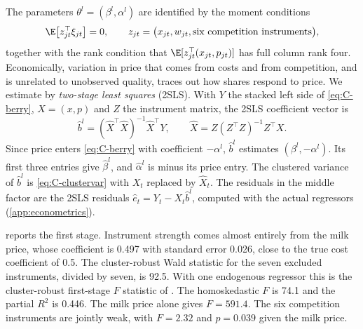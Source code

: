 The parameters $\theta^l = (\beta^l, \alpha^l)$ are identified by the moment conditions
\begin{equation}\label{eq:C-logit-moments}
  \E\big[z_{jt}^\top\xi_{jt}\big] = 0, \qquad z_{jt} = \big(x_{jt}, w_{jt}, \text{six competition instruments}\big),
\end{equation}
together with the rank condition that $\E[z_{jt}^\top(x_{jt}, p_{jt})]$ has full column rank four. Economically,
variation in price that comes from costs and from competition, and is unrelated to unobserved quality, traces out how
shares respond to price. We estimate by \emph{two-stage least squares} (2SLS). With $Y$ the stacked left side of
\eqref{eq:C-berry}, $X = (x, p)$ and $Z$ the instrument matrix, the 2SLS coefficient vector is
\[
  \hat b^l = (\hat X^\top\hat X)^{-1}\hat X^\top Y, \qquad \hat X = Z(Z^\top Z)^{-1}Z^\top X .
\]
Since price enters \eqref{eq:C-berry} with coefficient $-\alpha^l$, $\hat b^l$ estimates $(\beta^l, -\alpha^l)$. Its first
three entries give $\hat\beta^l$, and $\hat\alpha^l$ is minus its price entry. The clustered variance of $\hat b^l$ is
\eqref{eq:C-clustervar} with $X_t$ replaced by $\hat X_t$. The residuals in the middle factor are the 2SLS residuals
$\hat e_t = Y_t - X_t\hat b^l$, computed with the actual regressors (\cref{app:econometrics}).

 reports the first stage. Instrument strength comes almost entirely from the milk price,
whose coefficient is 0.497 with standard error 0.026, close to the true cost coefficient of 0.5. The cluster-robust Wald
statistic for the seven excluded instruments, divided by seven, is 92.5. With one endogenous regressor this is the
cluster-robust first-stage $F$ statistic of \citet{KleibergenPaap2006}. The homoskedastic $F$ is 74.1 and the partial $R^2$ is
0.446. The milk price alone gives $F = 591.4$. The six competition instruments are jointly weak, with $F = 2.32$ and
$p = 0.039$ given the milk price.

